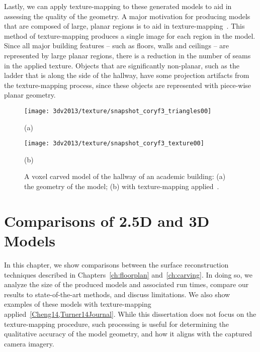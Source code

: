 \documentclass[12pt,onecolumn,oneside]{book}
\begin{document}
Lastly, we can apply texture-mapping to these generated models to aid in assessing the quality of the geometry.  A major motivation for producing models that are composed of large, planar regions is to aid in texture-mapping~\cite{Cheng13}.  This method of texture-mapping produces a single image for each region in the model.  Since all major building features -- such as floors, walls and ceilings -- are represented by large planar regions, there is a reduction in the number of seams in the applied texture.  Objects that are significantly non-planar, such as the ladder that is along the side of the hallway, have some projection artifacts from the texture-mapping process, since these objects are represented with piece-wise planar geometry.

\begin{figure}[t]

	\centering
	\begin{minipage}[b]{0.95\linewidth}
	\centerline{\texttt{[image: 3dv2013/texture/snapshot\_coryf3\_triangles00]}}
	\centerline{(a)}
	\end{minipage}
	\hfill
	\begin{minipage}[b]{0.95\linewidth}
	\centerline{\texttt{[image: 3dv2013/texture/snapshot\_coryf3\_texture00]}}
	\centerline{(b)}
	\end{minipage}

	\caption[Texture-mapping applied to voxel carving result.]{A voxel carved model of the hallway of an academic building: (a) the geometry of the model; (b) with texture-mapping applied~\cite{Cheng13}.}
	\label{fig:3dv2013_bhh_hallway}
\end{figure}


\chapter{Comparisons of 2.5D and 3D Models}
\label{ch:fp_carving_compare}

In this chapter, we show comparisons between the surface reconstruction techniques described in Chapters~\ref{ch:floorplan} and~\ref{ch:carving}.  In doing so, we analyze the size of the produced models and associated run times, compare our results to state-of-the-art methods, and discuss limitations.  We also show examples of these models with texture-mapping applied~\ref{Cheng14,Turner14Journal}.  While this dissertation does not focus on the texture-mapping procedure, such processing is useful for determining the qualitative accuracy of the model geometry, and how it aligns with the captured camera imagery.
\end{document}
